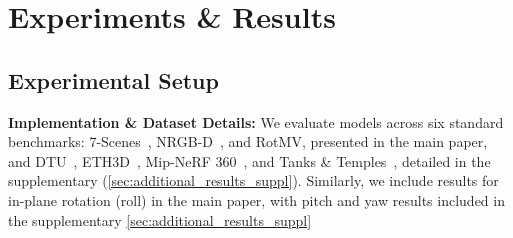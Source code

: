 \section{Experiments \& Results}
\subsection{Experimental Setup}
\label{sec:experimental_setup}
\textbf{Implementation \& Dataset Details:} 
We evaluate models across six standard benchmarks: 7-Scenes~\citep{7scenes1, 7scenes2}, NRGB-D~\citep{nrgdb_dataset}, and RotMV, presented in the main paper, and DTU~\citep{jensen2014largeDTU}, ETH3D~\citep{Schops_2019_CVPRETH3D1, schoeps2017cvprETH3D2}, Mip-NeRF 360~\citep{barron2022mipnerf360}, and Tanks \& Temples~\citep{Knapitsch2017tanksandtemples}, detailed in the supplementary (\cref{sec:additional_results_suppl}). Similarly, we include results for in-plane rotation (roll) in the main paper, with pitch and yaw results included in the supplementary \cref{sec:additional_results_suppl}

